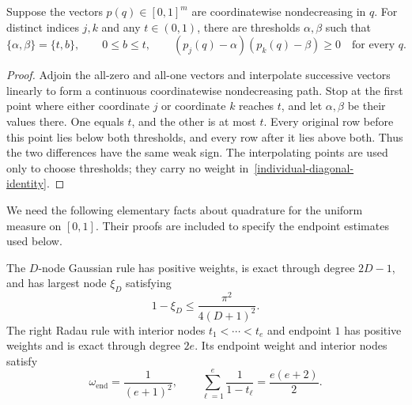 \begin{lemma}\label{individual-paired-thresholds}
Suppose the vectors \(p(q)\in[0,1]^m\) are coordinatewise
nondecreasing in \(q\).  For distinct indices \(j,k\) and any
\(t\in(0,1)\), there are thresholds \(\alpha,\beta\) such that
\[
  \{\alpha,\beta\}=\{t,b\},\qquad 0\leq b\leq t,
  \qquad
  (p_j(q)-\alpha)(p_k(q)-\beta)\geq0
  \quad\text{for every }q.
\]
\end{lemma}

\begin{proof}
Adjoin the all-zero and all-one vectors and interpolate successive
vectors linearly to form a continuous coordinatewise nondecreasing path.
Stop at the first point where either coordinate \(j\) or coordinate
\(k\) reaches \(t\), and let \(\alpha,\beta\) be their values there.
One equals \(t\), and the other is at most \(t\).  Every original row
before this point lies below both thresholds, and every row after it lies
above both.  Thus the two differences have the same weak sign.  The
interpolating points are used only to choose thresholds; they carry no
weight in~\eqref{individual-diagonal-identity}.
\end{proof}

We need the following elementary facts about quadrature for the uniform
measure on \([0,1]\).  Their proofs are included to specify the endpoint
estimates used below.

\begin{lemma}\label{individual-quadrature-facts}
The \(D\)-node Gaussian rule has positive weights, is exact through
degree \(2D-1\), and has largest node \(\xi_D\) satisfying
\begin{equation}\label{individual-gaussian-edge}
  1-\xi_D\leq\frac{\pi^2}{4(D+1)^2}.
\end{equation}
The right Radau rule with interior nodes \(t_1<\cdots<t_e\) and endpoint
\(1\) has positive weights and is exact through degree \(2e\).  Its
endpoint weight and interior nodes satisfy
\begin{equation}\label{individual-radau-identities}
  \omega_{\mathrm{end}}=\frac1{(e+1)^2},
  \qquad
  \sum_{\ell=1}^e\frac1{1-t_\ell}=\frac{e(e+2)}2.
\end{equation}
\end{lemma}

